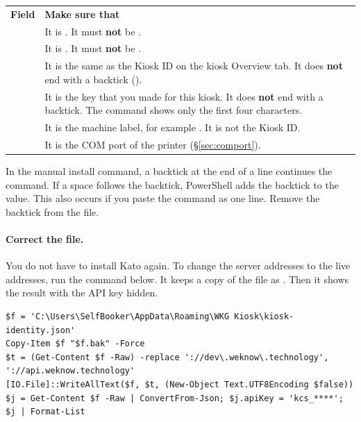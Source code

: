 \documentclass[a4paper,10pt]{article}
\begin{document}
\begin{center}
\renewcommand{\arraystretch}{1.35}\small
\begin{tabularx}{\textwidth}{L{40mm} X}
\color{white}\textbf{Field} &
\color{white}\textbf{Make sure that}\\
 &
It is .\newline
It must \textbf{not} be .\\
 &
It is .\newline
It must \textbf{not} be .\\
 &
It is the same as the Kiosk ID on the kiosk Overview tab. It does
\textbf{not} end with a backtick ().\\
 &
It is the key that you made for this kiosk. It does \textbf{not} end with
a backtick. The command shows only the first four characters.\\
 &
It is the machine label, for example . It is not the
Kiosk ID.\\
 &
It is the COM port of the printer (\S\ref{sec:comport}).\\
\end{tabularx}
\end{center}

\begin{wkwarn}
In the manual install command, a backtick at the end of a line continues
the command. If a space follows the backtick, PowerShell adds the
backtick to the value. This also occurs if you paste the command as one
line. Remove the backtick from the file.
\end{wkwarn}

\paragraph{Correct the file.} You do not have to install Kato again. To
change the  server addresses to the live addresses, run the
command below. It keeps a copy of the file as
. Then it shows the result with the API key
hidden.

\begin{lstlisting}
$f = 'C:\Users\SelfBooker\AppData\Roaming\WKG Kiosk\kiosk-identity.json'
Copy-Item $f "$f.bak" -Force
$t = (Get-Content $f -Raw) -replace '://dev\.weknow\.technology', '://api.weknow.technology'
[IO.File]::WriteAllText($f, $t, (New-Object Text.UTF8Encoding $false))
$j = Get-Content $f -Raw | ConvertFrom-Json; $j.apiKey = 'kcs_****'; $j | Format-List
\end{lstlisting}
\end{document}

